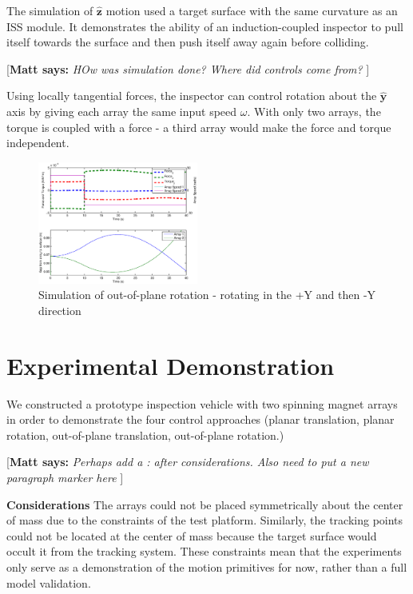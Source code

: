 \documentclass[letterpaper, 10 pt, conference]{ieeeconf}  %
\newcommand{\matt}[1]{{\color{darkgreen}\small\par {[{\bf Matt says:} {\em #1}} ] \\    }}
\begin{document}
The simulation of $\hat{\textbf{z}}$ motion used a target surface with the same curvature as an ISS module. It demonstrates the ability of an induction-coupled inspector to pull itself towards the surface and then push itself away again before colliding. 

\matt{HOw was simulation done? Where did controls come from?}


Using locally tangential forces, the inspector can control rotation about the $\hat{\textbf{y}}$ axis by giving each array the same input speed $\omega$. With only two arrays, the torque is coupled with a force - a third array would make the force and torque independent. 
   

   \begin{figure}[thpb]
      \centering
      \includegraphics[width = 0.47\textwidth]{figures/curve_rotations.eps}
      \caption{Simulation of out-of-plane rotation - rotating in the +Y and then -Y direction}
      \label{fig:ooprotation}
   \end{figure}


\section{Experimental Demonstration}\label{sec:experiments}
We constructed a prototype inspection vehicle with two spinning magnet arrays in order to demonstrate the four control approaches (planar translation, planar rotation, out-of-plane translation, out-of-plane rotation.) 

\matt{Perhaps add a   :  after considerations. Also need to put a new paragraph marker here}

\textbf{Considerations} The arrays could not be placed symmetrically about the center of mass due to the constraints of the test platform. Similarly, the tracking points could not be located at the center of mass because the target surface would occult it from the tracking system. These constraints mean that the experiments only serve as a demonstration of the motion primitives for now, rather than a full model validation.
\end{document}
